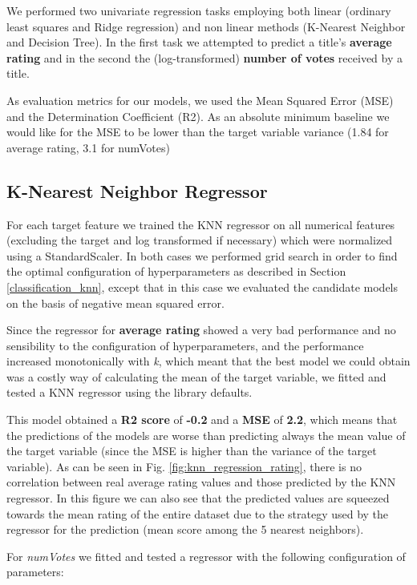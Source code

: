 We performed two univariate regression tasks employing both linear (ordinary least squares and Ridge regression) and non linear methods (K-Nearest Neighbor and Decision Tree).
In the first task we attempted to predict a title's \textbf{average rating} and in the second the (log-transformed) \textbf{number of votes} received by a title.

As evaluation metrics for our models, we used the Mean Squared Error (MSE)  and the Determination Coefficient (R2).
As an absolute minimum baseline we would like for the MSE to be lower than the target variable variance (1.84 for average rating, 3.1 for numVotes)

\subsection{K-Nearest Neighbor Regressor}
For each target feature we trained the KNN regressor on all numerical features (excluding the target and log transformed if necessary) which were normalized using a StandardScaler.
In both cases we performed grid search in order to find the optimal configuration of hyperparameters as described in Section \ref{classification_knn}, except that in this case we evaluated the candidate models on the basis of negative mean squared error.

Since the regressor for \textbf{average rating} showed a very bad performance and no sensibility to the configuration of hyperparameters, and the performance increased monotonically with \emph{k}, which meant that the best model we could obtain was a costly way of calculating the mean of the target variable, we fitted and tested a KNN regressor using the library defaults.

This model obtained a \textbf{R2 score} of \textbf{-0.2} and a \textbf{MSE} of \textbf{2.2}, which means that the predictions of the models are worse than predicting always the mean value of the target variable (since the MSE is higher than the variance of the target variable).
As can be seen in Fig. \ref{fig:knn_regression_rating}, there is no correlation between real average rating values and those predicted by the KNN regressor.
In this figure we can also see that the predicted values are squeezed towards the mean rating of the entire dataset due to the strategy used by the regressor for the prediction (mean score among the 5 nearest neighbors).


For \emph{numVotes} we fitted and tested a regressor with the following configuration of parameters:

